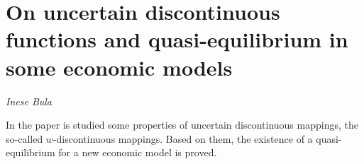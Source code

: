 \documentclass[../booklet.tex]{subfiles}
\begin{document}
\section[On uncertain discontinuous functions and quasi-equilibrium in some economic models. {\it Inese Bula}]{On uncertain discontinuous functions and quasi-equilibrium in some economic models}

\begin{center}
  {\it Inese Bula}
\end{center}

\vskip 0.8cm


In the paper is studied some properties of uncertain discontinuous mappings, the so-called $w$-discontinuous mappings. Based on them, the existence of a quasi-equilibrium for a new economic model is proved.
\end{document}
